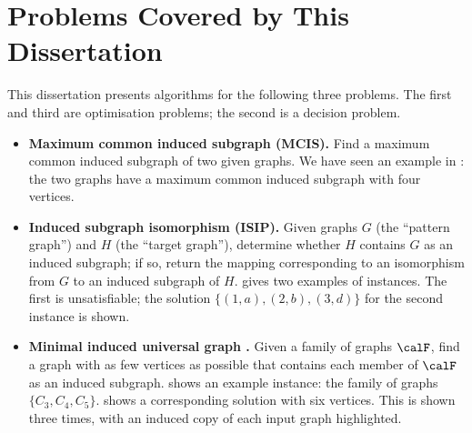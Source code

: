\section{Problems Covered by This Dissertation}\label{sec:problems}

This dissertation presents algorithms for the following three problems.
The first and third are optimisation problems; the second
is a decision problem.

\begin{itemize}
    \item \textbf{Maximum common induced subgraph  (MCIS).} Find
a maximum common induced subgraph of two given graphs.  We have seen an example
in : the two graphs have a maximum common induced subgraph
with four vertices.
    \item \textbf{Induced subgraph isomorphism  (ISIP).} Given graphs $G$ (the ``pattern graph'')
    and $H$ (the ``target graph''),
determine whether $H$ contains $G$ as an induced subgraph;
if so, return the mapping corresponding to an isomorphism from $G$ to an
        induced subgraph of $H$.
     gives two examples of instances. The first is unsatisfiable;
        the solution $\{(1,a),(2,b), (3,d)\}$ for the second instance is shown.
    \item \textbf{Minimal induced universal graph .} Given a family of graphs $\calF$,
find a graph with as few vertices as possible that contains each member of $\calF$
as an induced subgraph.
     shows an example instance: the family
        of graphs $\{C_3, C_4, C_5\}$.  
     shows a corresponding solution with six vertices.
        This is shown three times, with an induced copy of each input graph
        highlighted.  
\end{itemize}

